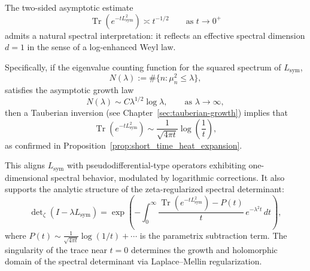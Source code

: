 \begin{remark}
\label{rem:spectral-dimension}
The two-sided asymptotic estimate
\[
\operatorname{Tr}(e^{-t L_{\mathrm{sym}}^2}) \asymp t^{-1/2} \qquad \text{as } t \to 0^+
\]
admits a natural spectral interpretation: it reflects an effective spectral dimension \( d = 1 \) in the sense of a log-enhanced Weyl law.

\medskip
\noindent
Specifically, if the eigenvalue counting function for the squared spectrum of \( L_{\mathrm{sym}} \),
\[
N(\lambda) := \#\{ n : \mu_n^2 \le \lambda \},
\]
satisfies the asymptotic growth law
\[
N(\lambda) \sim C \lambda^{1/2} \log \lambda, \qquad \text{as } \lambda \to \infty,
\]
then a Tauberian inversion (see Chapter~\ref{sec:tauberian-growth}) implies that
\[
\operatorname{Tr}(e^{-t L_{\mathrm{sym}}^2}) \sim \frac{1}{\sqrt{4\pi t}} \log\left( \frac{1}{t} \right),
\]
as confirmed in Proposition~\ref{prop:short_time_heat_expansion}.

\medskip
\noindent
This aligns \( L_{\mathrm{sym}} \) with pseudodifferential-type operators exhibiting one-dimensional spectral behavior, modulated by logarithmic corrections. It also supports the analytic structure of the zeta-regularized spectral determinant:
\[
\det\nolimits_\zeta(I - \lambda L_{\mathrm{sym}}) = \exp\left( - \int_0^\infty \frac{\operatorname{Tr}(e^{-t L_{\mathrm{sym}}^2}) - P(t)}{t} \, e^{-\lambda^2 t} \, dt \right),
\]
where \( P(t) \sim \frac{1}{\sqrt{4\pi t}} \log(1/t) + \cdots \) is the parametrix subtraction term. The singularity of the trace near \( t = 0 \) determines the growth and holomorphic domain of the spectral determinant via Laplace–Mellin regularization.
\end{remark}

